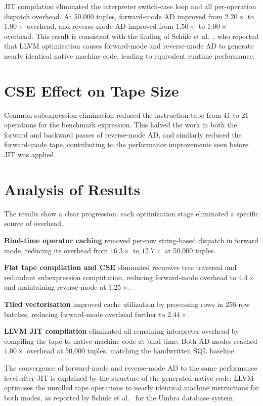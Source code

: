 \documentclass[12pt]{report}
\begin{document}
JIT compilation eliminated the interpreter switch-case loop and all
per-operation dispatch overhead. At 50{,}000 tuples, forward-mode AD improved
from $2.20\times$ to $1.00\times$ overhead, and reverse-mode AD improved from
$1.50\times$ to $1.00\times$ overhead. This result is consistent with the
finding of Schüle et al.~\cite{schule2022llvm}, who reported that LLVM
optimisation causes forward-mode and reverse-mode AD to generate nearly
identical native machine code, leading to equivalent runtime performance.

\section{CSE Effect on Tape Size}

Common subexpression elimination reduced the instruction tape from 41 to 21
operations for the benchmark expression. This halved the work in both the
forward and backward passes of reverse-mode AD, and similarly reduced the
forward-mode tape, contributing to the performance improvements seen before
JIT was applied.

\section{Analysis of Results}

The results show a clear progression: each optimization stage eliminated a
specific source of overhead.

\textbf{Bind-time operator caching} removed per-row string-based dispatch in
forward mode, reducing its overhead from $16.3\times$ to $12.7\times$ at
50{,}000 tuples.

\textbf{Flat tape compilation and CSE} eliminated recursive tree traversal
and redundant subexpression computation, reducing forward-mode overhead to
$4.4\times$ and maintaining reverse-mode at $1.25\times$.

\textbf{Tiled vectorisation} improved cache utilization by processing rows
in 256-row batches, reducing forward-mode overhead further to $2.44\times$.

\textbf{LLVM JIT compilation} eliminated all remaining interpreter overhead
by compiling the tape to native machine code at bind time. Both AD modes
reached $1.00\times$ overhead at 50{,}000 tuples, matching the handwritten
SQL baseline.

The convergence of forward-mode and reverse-mode AD to the same performance
level after JIT is explained by the structure of the generated native code:
LLVM optimises the unrolled tape operations to nearly identical machine
instructions for both modes, as reported by Schüle et al.~\cite{schule2022llvm}
for the Umbra database system.
\end{document}
